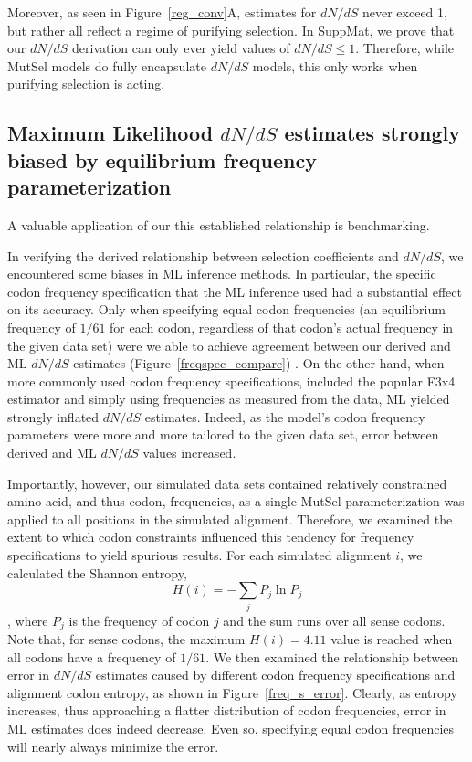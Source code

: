 \documentclass[11pt]{article}
\begin{document}
Moreover, as seen in Figure~\ref{reg_conv}A, estimates for $dN/dS$ never exceed 1, but rather all reflect a regime of purifying selection. In SuppMat, we prove that our $dN/dS$ derivation can only ever yield values of $dN/dS \leq 1$. Therefore, while MutSel models do fully encapsulate $dN/dS$ models, this only works when purifying selection is acting.


\subsection*{Maximum Likelihood $dN/dS$ estimates strongly biased by equilibrium frequency parameterization}


A valuable application of our this established relationship is benchmarking.

In verifying the derived relationship between selection coefficients and $dN/dS$, we encountered some biases in ML inference methods. In particular, the specific codon frequency specification that the ML inference used had a substantial effect on its accuracy. Only when specifying equal codon frequencies (an equilibrium frequency of $1/61$ for each codon, regardless of that codon's actual frequency in the given data set) were we able to achieve agreement between our derived and ML $dN/dS$ estimates (Figure~\ref{freqspec_compare}) . On the other hand, when more commonly used codon frequency specifications, included the popular F3x4 estimator and simply using frequencies as measured from the data, ML yielded strongly inflated $dN/dS$ estimates. Indeed, as the model's codon frequency parameters were more and more tailored to the given data set, error between derived and ML $dN/dS$ values increased.

Importantly, however, our simulated data sets contained relatively constrained amino acid, and thus codon, frequencies, as a single MutSel  parameterization was applied to all positions in the simulated alignment. Therefore, we examined the extent to which codon constraints influenced this tendency for frequency specifications to yield spurious results. For each simulated alignment $i$, we calculated the Shannon entropy, \begin{equation} H(i) = - \sum_j P_j \ln P_j \end{equation}, where $P_j$ is the frequency of codon $j$ and the sum runs over all sense codons. Note that, for sense codons, the maximum $H(i) = 4.11$ value is reached when all codons have a frequency of $1/61$. We then examined the relationship between error in $dN/dS$ estimates caused by different codon frequency specifications and alignment codon entropy, as shown in Figure~\ref{freq_s_error}. Clearly, as entropy increases, thus approaching a flatter distribution of codon frequencies, error in ML estimates does indeed decrease. Even so, specifying equal codon frequencies will nearly always minimize the error.
\end{document}
